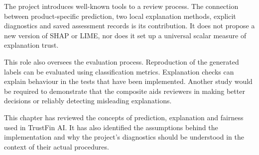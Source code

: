 The project introduces well-known tools to a review process. The connection between product-specific prediction, two local explanation methods, explicit diagnostics and saved assessment records is its contribution. It does not propose a new version of SHAP or LIME, nor does it set up a universal scalar measure of explanation trust.

This role also oversees the evaluation process. Reproduction of the generated labels can be evaluated using classification metrics. Explanation checks can explain behaviour in the tests that have been implemented. Another study would be required to demonstrate that the composite aids reviewers in making better decisions or reliably detecting misleading explanations.

\par\medskip\noindent
This chapter has reviewed the concepts of prediction, explanation and fairness used in TrustFin AI. It has also identified the assumptions behind the implementation and why the project's diagnostics should be understood in the context of their actual procedures.
